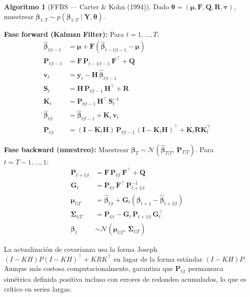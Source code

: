 \documentclass[12pt, a4paper]{article}
\theoremstyle{plain}
\theoremstyle{definition}
\newtheorem{algoritmo}{Algoritmo}[section]
\theoremstyle{remark}
\newcommand{\bbet}{\bm{\beta}}
\newcommand{\btau}{\bm{\tau}}
\newcommand{\bmu}{\bm{\mu}}
\newcommand{\bY}{\mathbf{Y}}
\newcommand{\by}{\mathbf{y}}
\newcommand{\bH}{\mathbf{H}}
\newcommand{\bF}{\mathbf{F}}
\newcommand{\bQ}{\mathbf{Q}}
\newcommand{\bR}{\mathbf{R}}
\newcommand{\bI}{\mathbf{I}}
\newcommand{\bP}{\mathbf{P}}
\newcommand{\bK}{\mathbf{K}}
\newcommand{\bG}{\mathbf{G}}
\newcommand{\bS}{\mathbf{S}}
\newcommand{\N}{\mathcal{N}}
\begin{document}
\begin{algoritmo}[FFBS — Carter \& Kohn (1994)]
\label{alg:ffbs}
Dado $\bm{\theta} = (\bmu, \bF, \bQ, \bR, \btau)$, muestrear
$\bbet_{1:T} \sim p(\bbet_{1:T} \mid \bY, \bm{\theta})$.

\textbf{Fase forward (Kalman Filter):} Para $t = 1, \ldots, T$:
\begin{align}
  \hat{\bbet}_{t|t-1} &= \bmu + \bF(\hat{\bbet}_{t-1|t-1} - \bmu) \label{eq:pred_state}\\
  \bP_{t|t-1} &= \bF\,\bP_{t-1|t-1}\,\bF^\top + \bQ \label{eq:pred_cov}\\
  \bm{v}_t &= \by_t - \bH\,\hat{\bbet}_{t|t-1} \label{eq:innov}\\
  \bS_t &= \bH\,\bP_{t|t-1}\,\bH^\top + \bR \label{eq:innov_var}\\
  \bK_t &= \bP_{t|t-1}\,\bH^\top\,\bS_t^{-1} \label{eq:kalman_gain}\\
  \hat{\bbet}_{t|t} &= \hat{\bbet}_{t|t-1} + \bK_t\,\bm{v}_t \label{eq:update_state}\\
  \bP_{t|t} &= (\bI - \bK_t\bH)\,\bP_{t|t-1}\,(\bI - \bK_t\bH)^\top + \bK_t\bR\bK_t^\top
  \label{eq:update_cov}
\end{align}

\textbf{Fase backward (muestreo):} Muestrear $\bbet_T \sim \N(\hat{\bbet}_{T|T},\, \bP_{T|T})$.
Para $t = T-1, \ldots, 1$:
\begin{align}
  \bP_{t+1|t} &= \bF\,\bP_{t|t}\,\bF^\top + \bQ \label{eq:pred_ahead}\\
  \bG_t &= \bP_{t|t}\,\bF^\top\,\bP_{t+1|t}^{-1} \label{eq:smooth_gain}\\
  \bm{\mu}_{t|T} &= \hat{\bbet}_{t|t}
    + \bG_t\!\left(\bbet_{t+1} - \hat{\bbet}_{t+1|t}\right) \label{eq:smooth_mean}\\
  \bm{\Sigma}_{t|T} &= \bP_{t|t} - \bG_t\,\bP_{t+1|t}\,\bG_t^\top \label{eq:smooth_cov}\\
  \bbet_t &\sim \N\!\left(\bm{\mu}_{t|T},\, \bm{\Sigma}_{t|T}\right) \label{eq:back_sample}
\end{align}
\end{algoritmo}

\begin{notabox}
La actualización de covarianza usa la forma Joseph
$(I-KH)P(I-KH)^\top + KRK^\top$ en lugar de la forma estándar $(I-KH)P$.
Aunque más costosa computacionalmente, garantiza que $\bP_{t|t}$ permanezca
simétrica definida positiva incluso con errores de redondeo acumulados,
lo que es crítico en series largas.
\end{notabox}
\end{document}

